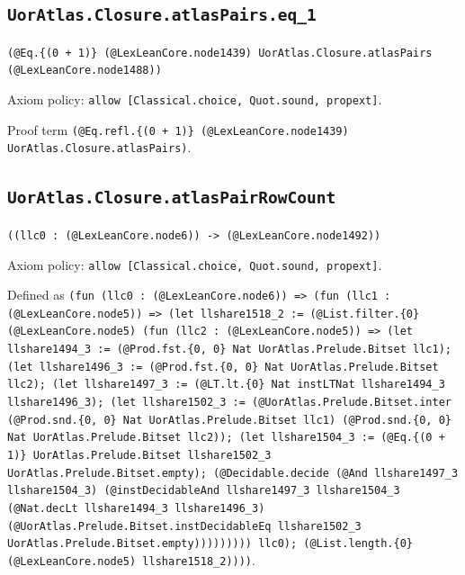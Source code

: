 \documentclass[11pt]{article}
\begin{document}
\subsection*{\texttt{UorAtlas.Closure.atlasPairs.eq\_1}}
\noindent\texttt{(@Eq.\{(0 + 1)\} (@LexLeanCore.node1439) UorAtlas.Closure.atlasPairs (@LexLeanCore.node1488))}\par
\noindent Axiom policy: \texttt{allow [Classical.choice, Quot.sound, propext]}.\par
\noindent Proof term \texttt{(@Eq.refl.\{(0 + 1)\} (@LexLeanCore.node1439) UorAtlas.Closure.atlasPairs)}.\par
\subsection*{\texttt{UorAtlas.Closure.atlasPairRowCount}}
\noindent\texttt{((llc0 : (@LexLeanCore.node6)) -> (@LexLeanCore.node1492))}\par
\noindent Axiom policy: \texttt{allow [Classical.choice, Quot.sound, propext]}.\par
\noindent Defined as \texttt{(fun (llc0 : (@LexLeanCore.node6)) => (fun (llc1 : (@LexLeanCore.node5)) => (let llshare1518\_2 := (@List.filter.\{0\} (@LexLeanCore.node5) (fun (llc2 : (@LexLeanCore.node5)) => (let llshare1494\_3 := (@Prod.fst.\{0, 0\} Nat UorAtlas.Prelude.Bitset llc1); (let llshare1496\_3 := (@Prod.fst.\{0, 0\} Nat UorAtlas.Prelude.Bitset llc2); (let llshare1497\_3 := (@LT.lt.\{0\} Nat instLTNat llshare1494\_3 llshare1496\_3); (let llshare1502\_3 := (@UorAtlas.Prelude.Bitset.inter (@Prod.snd.\{0, 0\} Nat UorAtlas.Prelude.Bitset llc1) (@Prod.snd.\{0, 0\} Nat UorAtlas.Prelude.Bitset llc2)); (let llshare1504\_3 := (@Eq.\{(0 + 1)\} UorAtlas.Prelude.Bitset llshare1502\_3 UorAtlas.Prelude.Bitset.empty); (@Decidable.decide (@And llshare1497\_3 llshare1504\_3) (@instDecidableAnd llshare1497\_3 llshare1504\_3 (@Nat.decLt llshare1494\_3 llshare1496\_3) (@UorAtlas.Prelude.Bitset.instDecidableEq llshare1502\_3 UorAtlas.Prelude.Bitset.empty))))))))) llc0); (@List.length.\{0\} (@LexLeanCore.node5) llshare1518\_2))))}.\par
\end{document}

